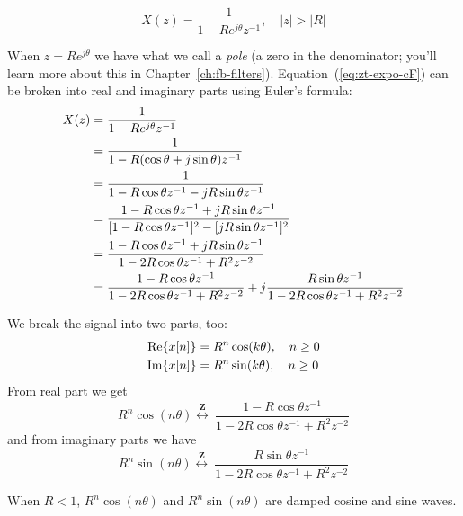 \begin{equation}
X(z)=\frac{1}{1-Re^{j\theta}z^{-1}}, \quad |z|>|R|
\label{eq:zt-expo-cF}
\end{equation}

When $z=Re^{j\theta}$ we have what we call a \emph{pole} (a zero in the
denominator; you'll learn more about this in
Chapter~\ref{ch:fb-filters}). Equation~(\ref{eq:zt-expo-cF}) can be
broken into real and imaginary parts using Euler's formula:
\begin{align}
X(z) &= \frac{1}{1-Re^{j\theta}z^{-1}} \notag\\
     &= \frac{1}{1-R(\cos\theta+j \sin\theta )z^{-1}} \notag\\
     &= \frac{1}{1-R\cos\theta z^{-1}-j R\sin\theta z^{-1}} \notag\\
     &= \frac{1-R\cos\theta z^{-1}+j R\sin\theta z^{-1}}
     {[1-R\cos\theta z^{-1}]^2 - [jR\sin\theta z^{-1}]^2} \notag\\
     &= \frac{1-R\cos\theta z^{-1}+j R\sin\theta z^{-1}}
     {1-2R\cos\theta z^{-1} + R^2 z^{-2}} \notag\\
     &= \frac{1-R\cos\theta z^{-1}}
     {1-2R\cos\theta z^{-1} + R^2 z^{-2}}
     +j\frac{R\sin\theta z^{-1}}
     {1-2R\cos\theta z^{-1} + R^2 z^{-2}}
\end{align}

We break the signal into two parts, too:
\begin{align}
\operatorname{Re}\{x[n]\} &= R^n\cos(k\theta), \quad n\ge 0\\
\operatorname{Im}\{x[n]\} &= R^n\sin(k\theta), \quad n\ge 0
\end{align}
From real part we get
\begin{equation}
R^n\cos(n\theta)\stackrel{\mathbf{Z}}{\longleftrightarrow} \
\frac{1-R\cos\theta z^{-1}}
{1-2R\cos\theta z^{-1} + R^2 z^{-2}}
\end{equation}
and from imaginary parts we have
\begin{equation}
R^n\sin(n\theta)\stackrel{\mathbf{Z}}{\longleftrightarrow} \
\frac{R\sin\theta z^{-1}}
{1-2R\cos\theta z^{-1} + R^2 z^{-2}}
\end{equation}

When $R<1$, $R^n\cos(n\theta)$ and $R^n\sin(n\theta)$ are damped
cosine and sine waves.


